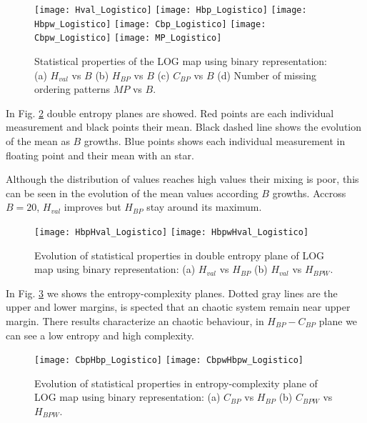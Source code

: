 \begin{figure}
	\texttt{[image: Hval\_Logistico]}
	\texttt{[image: Hbp\_Logistico]}
	\texttt{[image: Hbpw\_Logistico]}
	\texttt{[image: Cbp\_Logistico]}
	\texttt{[image: Cbpw\_Logistico]}
	\texttt{[image: MP\_Logistico]}
	\caption{Statistical properties of the LOG map using binary representation: (a) $H_{val}$ vs $B$ (b) $H_{BP}$ vs $B$ (c) $C_{BP}$ vs $B$ (d) Number of missing ordering patterns $MP$ vs $B$.}
	\label{fig:LOG_QuantiB}
\end{figure}

In Fig. \ref{fig:LOG_HH} double entropy planes are showed.
Red points are each individual measurement and black points their mean.
Black dashed line shows the evolution of the mean as $B$ growths.
Blue points shows each individual measurement in floating point and their mean with an star.

Although the distribution of values reaches high values their mixing is poor, this can be seen in the evolution of the mean values according $B$ growths.
Accross $B=20$, $H_{val}$ improves but $H_{BP}$ stay around its maximum.

\begin{figure}
	\texttt{[image: HbpHval\_Logistico]}
	\texttt{[image: HbpwHval\_Logistico]}
	\caption{Evolution of statistical properties in double entropy plane of LOG map using binary representation: (a) $H_{val}$ vs $H_{BP}$ (b) $H_{val}$ vs $H_{BPW}$.}
	\label{fig:LOG_HH}
\end{figure}

In Fig. \ref{fig:LOG_HC} we shows the entropy-complexity planes.
Dotted gray lines are the upper and lower margins, is spected that an chaotic system remain near upper margin.
There results characterize an chaotic behaviour, in $H_{BP}-C_{BP}$ plane we can see a low entropy and high complexity.

\begin{figure}
	\texttt{[image: CbpHbp\_Logistico]}
	\texttt{[image: CbpwHbpw\_Logistico]}
	\caption{Evolution of statistical properties in entropy-complexity plane of LOG map using binary representation: (a) $C_{BP}$ vs $H_{BP}$ (b) $C_{BPW}$ vs $H_{BPW}$.}
	\label{fig:LOG_HC}
\end{figure}
